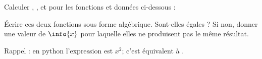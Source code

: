 
\begin{exercice}\label{exosmath-0043}

    Calculer , ,  et  pour les fonctions  et  données ci-dessous :
    \begin{multicols}{2}
        
        \columnbreak
        
    \end{multicols}
    Écrire ces deux fonctions sous forme algébrique. Sont-elles égales ? Si non, donner une valeur de \( \info{x}\) pour laquelle elles ne produisent pas le même résultat.

    Rappel : en python l'expression  est \( x^2\); c'est équivalent à .

\end{exercice}
